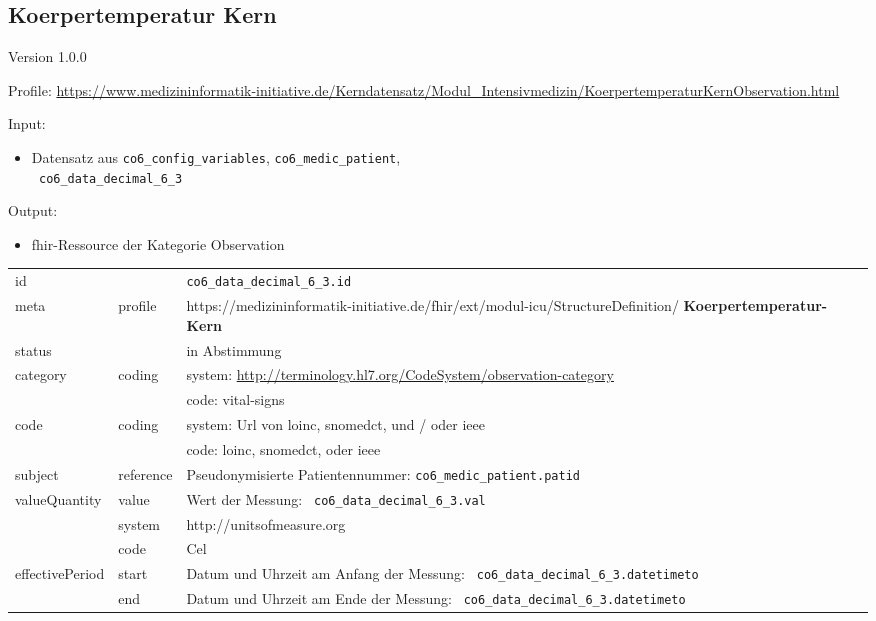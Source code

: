 \subsection{Koerpertemperatur Kern} 
\noindent Version 1.0.0

\noindent Profile: \url{https://www.medizininformatik-initiative.de/Kerndatensatz/Modul_Intensivmedizin/KoerpertemperaturKernObservation.html}

\noindent Input:
\begin{itemize}
	\item Datensatz aus \texttt{co6\_config\_variables}, \texttt{co6\_medic\_patient}, \\ \texttt{
co6\_data\_decimal\_6\_3}
\end{itemize}
Output:
\begin{itemize}
        \item \ac{fhir}-Ressource der Kategorie \glqq Observation\grqq{}
\end{itemize}
\begin{longtable}{|l|l|p{7.5cm}|}
        \hline
        \rowcolor{lightgray} \multicolumn{3}{|l|}{Data Mapping (inhaltlich)} \\ \hline
        id &  & \texttt{co6\_data\_decimal\_6\_3.id} \\ \hline
	meta & profile & https://medizininformatik-initiative.de/fhir/ext/modul-icu/StructureDefinition/\textbf{
Koerpertemperatur-Kern} \\ \hline 
	status &  & in Abstimmung  \\ \hline 
	category & coding & system: \url{http://terminology.hl7.org/CodeSystem/observation-category} \\
\cline{3-3}
	& & code: vital-signs \\ \hline
	code & coding & system: Url von \ac{loinc}, \ac{snomedct}, und / oder \ac{ieee} \\ 
	\cline{3-3} 
	 &  & code: \ac{loinc}, \ac{snomedct}, oder \ac{ieee} \\ \hline
	subject & reference & Pseudonymisierte Patientennummer: \texttt{co6\_medic\_patient.patid} \\ \hline
	valueQuantity & value & Wert der Messung: \texttt{
co6\_data\_decimal\_6\_3.val} \\
        \cline{2-3}
         & system & http://unitsofmeasure.org \\
         \cline{2-3}
         & code & Cel \\ \hline
    effectivePeriod & start & Datum und Uhrzeit am Anfang der Messung: \texttt{
co6\_data\_decimal\_6\_3.datetimeto} \\
    \cline{2-3}
     & end & Datum und Uhrzeit am Ende der Messung: \texttt{
co6\_data\_decimal\_6\_3.datetimeto} \\ \hline
\end{longtable}


